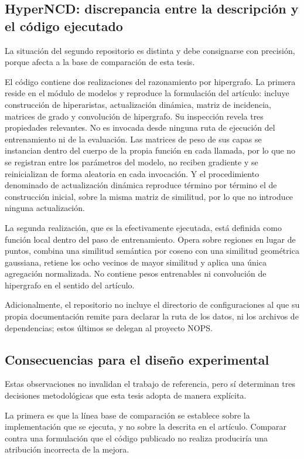 \subsection{HyperNCD: discrepancia entre la descripción y el código ejecutado}

La situación del segundo repositorio es distinta y debe consignarse con
precisión, porque afecta a la base de comparación de esta tesis.

El código contiene dos realizaciones del razonamiento por hipergrafo. La primera
reside en el módulo de modelos y reproduce la formulación del artículo: incluye
construcción de hiperaristas, actualización dinámica, matriz de incidencia,
matrices de grado y convolución de hipergrafo. Su inspección revela tres
propiedades relevantes. No es invocada desde ninguna ruta de ejecución del
entrenamiento ni de la evaluación. Las matrices de peso de sus capas se
instancian dentro del cuerpo de la propia función en cada llamada, por lo que no
se registran entre los parámetros del modelo, no reciben gradiente y se
reinicializan de forma aleatoria en cada invocación. Y el procedimiento
denominado de actualización dinámica reproduce término por término el de
construcción inicial, sobre la misma matriz de similitud, por lo que no
introduce ninguna actualización.

La segunda realización, que es la efectivamente ejecutada, está definida como
función local dentro del paso de entrenamiento. Opera sobre regiones en lugar de
puntos, combina una similitud semántica por coseno con una similitud geométrica
gaussiana, retiene los ocho vecinos de mayor similitud y aplica una única
agregación normalizada. No contiene pesos entrenables ni convolución de
hipergrafo en el sentido del artículo.

Adicionalmente, el repositorio no incluye el directorio de configuraciones al que
su propia documentación remite para declarar la ruta de los datos, ni los
archivos de dependencias; estos últimos se delegan al proyecto NOPS.

\subsection{Consecuencias para el diseño experimental}

Estas observaciones no invalidan el trabajo de referencia, pero sí determinan
tres decisiones metodológicas que esta tesis adopta de manera explícita.

La primera es que la línea base de comparación se establece sobre la
implementación que se ejecuta, y no sobre la descrita en el artículo. Comparar
contra una formulación que el código publicado no realiza produciría una
atribución incorrecta de la mejora.

